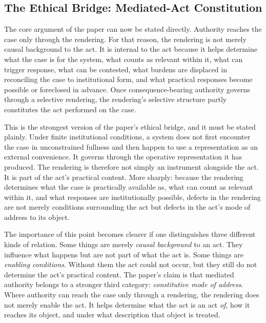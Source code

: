\documentclass[11pt]{article}
\renewcommand{\emph}[1]{\textit{#1}}
\begin{document}
\subsection{The Ethical Bridge: Mediated-Act Constitution}

The core argument of the paper can now be stated directly. Authority reaches the case only through the rendering. For that reason, the rendering is not merely causal background to the act. It is internal to the act because it helps determine what the case is for the system, what counts as relevant within it, what can trigger response, what can be contested, what burdens are displaced in reconciling the case to institutional form, and what practical responses become possible or foreclosed in advance. Once consequence-bearing authority governs through a selective rendering, the rendering's selective structure partly constitutes the act performed on the case. \cite{Swanson2026MediatedJudgmentConstraint,Swanson2026ConstraintConditionDisclosure,Swanson2026EmbeddedProcess}

This is the strongest version of the paper's ethical bridge, and it must be stated plainly. Under finite institutional conditions, a system does not first encounter the case in unconstrained fullness and then happen to use a representation as an external convenience. It governs through the operative representation it has produced. The rendering is therefore not simply an instrument alongside the act. It is part of the act's practical content. More sharply: because the rendering determines what the case is practically available as, what can count as relevant within it, and what responses are institutionally possible, defects in the rendering are not merely conditions surrounding the act but defects in the act's mode of address to its object.

The importance of this point becomes clearer if one distinguishes three different kinds of relation. Some things are merely \emph{causal background} to an act. They influence what happens but are not part of what the act is. Some things are \emph{enabling conditions}. Without them the act could not occur, but they still do not determine the act's practical content. The paper's claim is that mediated authority belongs to a stronger third category: \emph{constitutive mode of address}. Where authority can reach the case only through a rendering, the rendering does not merely enable the act. It helps determine what the act is an act \emph{of}, how it reaches its object, and under what description that object is treated.
\end{document}
